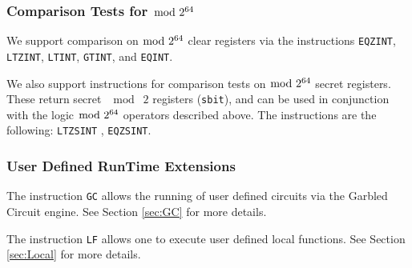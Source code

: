 \subsubsection{Comparison Tests for $\bmod \; 2^{64}$}
We support comparison on $\bmod \; 2^{64}$ clear registers via the instructions
\verb+EQZINT+, \verb+LTZINT+, \verb+LTINT+, \verb+GTINT+, and \verb+EQINT+.

We also support instructions for comparison tests on $\bmod \; 2^{64}$ secret registers. These return
secret $\mod \; 2$ registers (\verb+sbit+), and can be used in conjunction with the logic $\bmod \; 2^{64}$ operators described above. The instructions are the following:
\verb+LTZSINT+ ,
\verb+EQZSINT+.

\subsubsection{User Defined RunTime Extensions}
The instruction \verb+GC+ allows the running of user defined
circuits via the Garbled Circuit engine.
See Section \ref{sec:GC} for more details.

The instruction \verb|LF| allows one to execute user defined
local functions.
See Section \ref{sec:Local} for more details.

